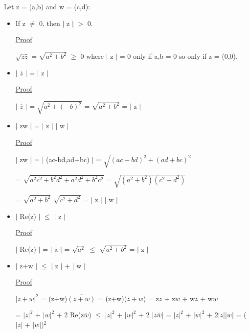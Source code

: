 	\qquad Let z = (a,b) and w = (c,d):
	\begin{itemize}[leftmargin=2cm]
		\item If z $\neq$ 0, then $|$ z $|$ $>$ 0.

			{ \color{magenta} \underline{Proof} } 
			
			$\sqrt{z\overline{z}}$ = $\sqrt{a^2 + b^2}$ $\geq$ 0
			where $|$ z $|$ = 0 only if a,b = 0 so only if z = (0,0).

		\item $|$ $\overline{z}$ $|$ = $|$ z  $|$

			{ \color{magenta} \underline{Proof} } 
			
			$|$ $\overline{z}$ $|$ = $\sqrt{a^2 + (-b)^2}$ = $\sqrt{a^2 + b^2}$ = $|$ z $|$

		\item $|$ zw $|$ = $|$ z $|$ $|$ w $|$

			{ \color{magenta} \underline{Proof} } 
			
			$|$ zw $|$ = $|$ (ac-bd,ad+bc) $|$ = $\sqrt{(ac-bd)^2 + (ad+bc)^2}$
			
			= $\sqrt{a^2c^2 + b^2d^2 + a^2d^2 + b^2c^2}$
			= $\sqrt{(a^2+b^2)(c^2+d^2)}$

			= $\sqrt{a^2+b^2}$ $\sqrt{c^2+d^2}$ = $|$ z $|$ $|$ w $|$

		\item $|$ Re(z) $|$ $\leq$ $|$ z $|$

			{ \color{magenta} \underline{Proof} } 
			
			$|$ Re(z) $|$ = $|$ a $|$ = $\sqrt{a^2}$ $\leq$ $\sqrt{a^2+b^2}$
			= $|$ z $|$

		\item $|$ z+w $|$ $ \leq $  $|$ z $|$ + $|$ w $|$

			{ \color{magenta} \underline{Proof} } 
			
			$| z+w |^2$ = (z+w)$\overline{(z+w)}$ = (z+w)($\overline{z} + \overline{w}$)
			= z$\overline{z}$ + z$\overline{w}$ + w$\overline{z}$ + w$\overline{w}$
			
			= $|z|^2$ + $|w|^2$ + 2 Re(z$\overline{w}$)
			$\leq$ $|z|^2$ + $|w|^2$ + 2 $|z\overline{w}|$
			= $|z|^2$ + $|w|^2$ + 2$|z||w|$
			= ($|z|$ + $|w|$)$^2$
	\end{itemize}


